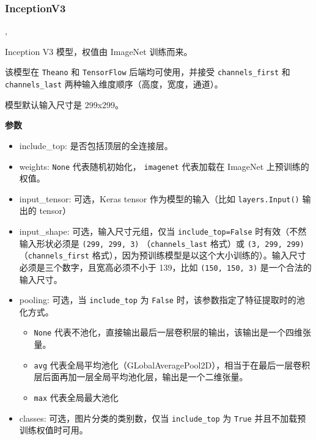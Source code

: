 \subsubsection{InceptionV3}\label{inceptionv3}

\begin{Shaded}
\begin{Highlighting}[]
\OperatorTok{=}\OperatorTok{=}, \\
\hspace{3cm}\OperatorTok{=}\OperatorTok{=}\OperatorTok{=}\OperatorTok{=}\NormalTok{)}
\end{Highlighting}
\end{Shaded}

Inception V3 模型，权值由 ImageNet 训练而来。

该模型在 \texttt{Theano} 和 \texttt{TensorFlow} 后端均可使用，并接受
\texttt{channels\_first} 和 \texttt{channels\_last}
两种输入维度顺序（高度，宽度，通道）。

模型默认输入尺寸是 299x299。

\textbf{参数}\label{ux53c2ux6570-4}

\begin{itemize}
\tightlist
\item
  include\_top: 是否包括顶层的全连接层。
\item
  weights: \texttt{None} 代表随机初始化，
  \texttt{\textquotesingle{}imagenet\textquotesingle{}} 代表加载在
  ImageNet 上预训练的权值。
\item
  input\_tensor: 可选，Keras tensor 作为模型的输入（比如
  \texttt{layers.Input()} 输出的 tensor）
\item
  input\_shape: 可选，输入尺寸元组，仅当 \texttt{include\_top=False}
  时有效（不然输入形状必须是 \texttt{(299,\ 299,\ 3)}
  （\texttt{channels\_last} 格式）或 \texttt{(3,\ 299,\ 299)}
  （\texttt{channels\_first}
  格式），因为预训练模型是以这个大小训练的）。输入尺寸必须是三个数字，且宽高必须不小于
  139，比如 \texttt{(150,\ 150,\ 3)} 是一个合法的输入尺寸。
\item
  pooling: 可选，当 \texttt{include\_top} 为 \texttt{False}
  时，该参数指定了特征提取时的池化方式。

  \begin{itemize}
  \tightlist
  \item
    \texttt{None}
    代表不池化，直接输出最后一层卷积层的输出，该输出是一个四维张量。
  \item
    \texttt{\textquotesingle{}avg\textquotesingle{}}
    代表全局平均池化（GLobalAveragePool2D），相当于在最后一层卷积层后面再加一层全局平均池化层，输出是一个二维张量。
  \item
    \texttt{\textquotesingle{}max\textquotesingle{}} 代表全局最大池化
  \end{itemize}
\item
  classes: 可选，图片分类的类别数，仅当 \texttt{include\_top} 为
  \texttt{True} 并且不加载预训练权值时可用。
\end{itemize}

